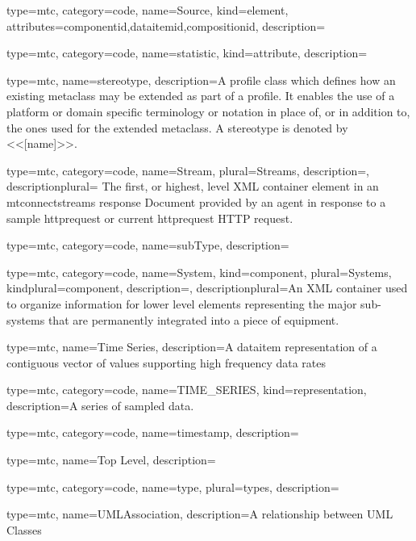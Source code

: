 {
  type=mtc,
  category=code,
  name={Source},
  kind={element},
  attributes={\gls{componentid},\gls{dataitemid},\gls{compositionid}},
  description={}
}


{
  type=mtc,
  category=code,
  name={statistic},
  kind={attribute},
  description={}
}


{
  type=mtc,
  name=stereotype,
  description={A profile class which defines how an existing metaclass may be extended as part of a profile. It enables the use of a platform or domain specific terminology or notation in place of, or in addition to, the ones used for the extended metaclass. A stereotype is denoted by <<[name]>>.}
}


{
  type=mtc,
  category=code,
  name={Stream},
  plural={Streams},
  description={},
  descriptionplural= {The first, or highest, level XML container element in an \glspl{mtconnectstream} \gls{response} Document provided by an \gls{agent} in response to a \gls{sample httprequest} or \gls{current httprequest} HTTP \gls{request}.}
}


{
  type=mtc,
  category=code,
  name={subType},
  description={}
}


{
  type=mtc,
  category=code,
  name={System},
  kind={component},
  plural={Systems},
  kindplural={component},
  description={},
  descriptionplural={An XML container used to organize information for \gls{lower level} elements representing the major sub-systems that are permanently integrated into a piece of equipment.}
}


{
  type=mtc,
  name={Time Series},
  description={A \gls{dataitem} representation of a contiguous vector of values supporting high frequency data rates}
}


{
  type=mtc,
  category=code,
  name={TIME\_SERIES},
  kind={representation},
  description={A series of sampled data. }
}


{
  type=mtc,
  category=code,
  name={timestamp},
  description={}
}


{
  type=mtc,
  name={Top Level},
  description={}
}


{
  type=mtc,
  category=code,
  name={type},
  plural={types},
  description={}
}


{
  type=mtc,
  name=UMLAssociation,
  description={A relationship between UML Classes}
}


